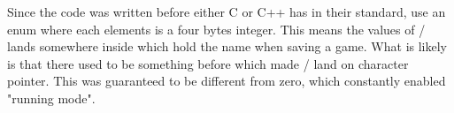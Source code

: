 \par
Since the code was written before either C or C++ has  in their standard, \doom{} use an enum where each elements is a four bytes integer. This means the values of / lands somewhere inside  which hold the name when saving a game. What is likely is that there used to be something before  which made / land on  character pointer. This was guaranteed to be different from zero, which constantly enabled "running mode".\\
\par









